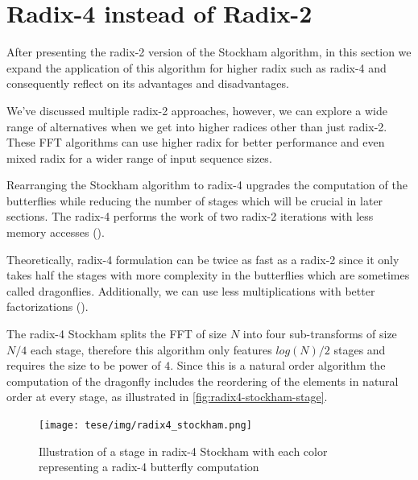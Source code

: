 \documentclass[
  oneside,
  11pt, a4paper,
  footinclude=true,
  headinclude=true,
  cleardoublepage=empty
]{scrbook}
\begin{document}
\section{Radix-4 instead of Radix-2} \label{sec:radix4-instead-of-radix2}
After presenting the radix-2 version of the Stockham algorithm, in this section we expand the application of this algorithm for higher radix such as radix-4 and consequently reflect on its advantages and disadvantages.

We've discussed multiple radix-2 approaches, however, we can explore a wide range of alternatives when we get into higher radices other than just radix-2. These FFT algorithms can use higher radix for better performance and even mixed radix \cite{singleton1969algorithm} for a wider range of input sequence sizes.

Rearranging the Stockham algorithm to radix-4 upgrades the computation of the butterflies while reducing the number of stages which will be crucial in later sections.
The radix-4 performs the work of two radix-2 iterations with less memory accesses (\cite{bailey1988high}).

Theoretically, radix-4 formulation can be twice as fast as a radix-2 \cite{hussain2010evaluation} since it only takes half the stages with more complexity in the butterflies which are sometimes called dragonflies. Additionally, we can use less multiplications with better factorizations (\cite{marti2009radix}).

The radix-4 Stockham splits the FFT of size $N$ into four sub-transforms of size $N/4$ each stage, therefore this algorithm only features $log(N)/2$ stages and requires the size to be power of $4$. Since this is a natural order algorithm the computation of the dragonfly includes the reordering of the elements in natural order at every stage, as illustrated in \autoref{fig:radix4-stockham-stage}.

\begin{figure}[h] 
    \centering
    \texttt{[image: tese/img/radix4\_stockham.png]}
    \caption{Illustration of a stage in radix-4 Stockham with each color representing a radix-4 butterfly computation}
    \label{fig:radix4-stockham-stage}
\end{figure}
\end{document}
